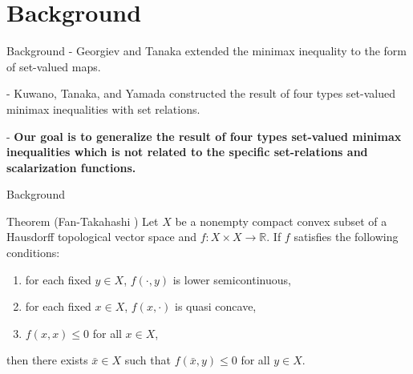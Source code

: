 \documentclass[aspectratio=169, dvipdfmx, 11pt]{beamer}
\newcommand{\RealNumberSet}{\mathbb{R}}
\begin{document}
\section{Background}

\begin{frame}{Background}
  - Georgiev and Tanaka \cite{MR1807037} extended the minimax inequality to the form of set-valued maps.

  - Kuwano, Tanaka, and Yamada \cite{MR2778674} constructed the result of four types set-valued minimax inequalities
  with set relations.

  - \textbf{Our goal is to generalize the result of four types set-valued minimax inequalities which is not related to the specific set-relations and scalarization functions.}
\end{frame}

\begin{frame}{Background}
  \begin{block}{Theorem (Fan-Takahashi \cite{MR399979})} %
    Let $X$ be a nonempty compact convex subset of a Hausdorff topological vector space and $f \colon X \times X \to \RealNumberSet$. If $f$ satisfies
    the following conditions:
    \begin{enumerate}
      \item for each fixed $y \in X$, $f(\cdot,y)$ is lower semicontinuous,
      \item for each fixed $x \in X$, $f(x,\cdot)$ is quasi concave,
      \item $f(x,x) \leq 0$ for all $x \in X$,
    \end{enumerate}
    then there exists $\bar{x} \in X$ such that $f(\bar{x},y) \leq 0$ for all $y \in X$.
  \end{block}
\end{frame}
\end{document}
